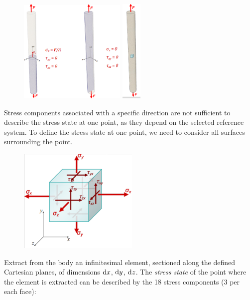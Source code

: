 \documentclass[class=report, crop=false, 12pt,a4paper]{standalone}
\begin{document}
\begin{figure}[H]
    \begin{minipage}{0.5\textwidth}
        \centering
        \includegraphics[height = 5cm]{../img/diagram40.png}
    \end{minipage}
    \begin{minipage}{0.5\textwidth}
        \centering
        \includegraphics[height = 5cm]{../img/diagram41.png}
    \end{minipage}
    \caption{}
\end{figure}
Stress components associated with a specific direction are not sufficient to describe the stress state at one point, as they depend on the selected reference system. To define the stress state at one point, we need to consider all surfaces surrounding the point. 
\begin{figure}[H]
    \centering
    \includegraphics[height = 5cm]{../img/diagram42.png}
    \caption{}
\end{figure}
Extract from the body an infinitesimal element, sectioned along the defined Cartesian planes, of dimensions $\dif x$, $\dif y$, $\dif z$. The \textit{stress state} of the point where the element is extracted can be described by the 18 stress components (3 per each face):
\end{document}
